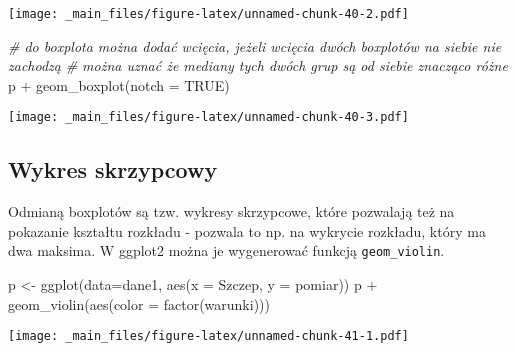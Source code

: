 \documentclass[
]{book}
\newenvironment{Shaded}{\begin{snugshade}}{\end{snugshade}}
\newcommand{\AttributeTok}[1]{\textcolor[rgb]{0.77,0.63,0.00}{#1}}
\newcommand{\CommentTok}[1]{\textcolor[rgb]{0.56,0.35,0.01}{\textit{#1}}}
\newcommand{\ConstantTok}[1]{\textcolor[rgb]{0.00,0.00,0.00}{#1}}
\newcommand{\FunctionTok}[1]{\textcolor[rgb]{0.00,0.00,0.00}{#1}}
\newcommand{\NormalTok}[1]{#1}
\newcommand{\OtherTok}[1]{\textcolor[rgb]{0.56,0.35,0.01}{#1}}
\newcommand{\SpecialCharTok}[1]{\textcolor[rgb]{0.00,0.00,0.00}{#1}}
\begin{document}
\texttt{[image: \_main\_files/figure-latex/unnamed-chunk-40-2.pdf]}

\begin{Shaded}
\begin{Highlighting}[]
\CommentTok{\# do boxplota można dodać wcięcia, jeżeli wcięcia dwóch boxplotów na siebie nie zachodzą }
\CommentTok{\# można uznać że mediany tych dwóch grup są od siebie znacząco różne}
\NormalTok{p }\SpecialCharTok{+} \FunctionTok{geom\_boxplot}\NormalTok{(}\AttributeTok{notch =} \ConstantTok{TRUE}\NormalTok{)}
\end{Highlighting}
\end{Shaded}

\texttt{[image: \_main\_files/figure-latex/unnamed-chunk-40-3.pdf]}

\hypertarget{wykres-skrzypcowy}{%
\subsection{Wykres skrzypcowy}\label{wykres-skrzypcowy}}

Odmianą boxplotów są tzw. wykresy skrzypcowe, które pozwalają też na pokazanie kształtu rozkładu - pozwala to np. na wykrycie rozkładu, który ma dwa maksima. W ggplot2 można je wygenerować funkcją \texttt{geom\_violin}.

\begin{Shaded}
\begin{Highlighting}[]
\NormalTok{p }\OtherTok{\textless{}{-}} \FunctionTok{ggplot}\NormalTok{(}\AttributeTok{data=}\NormalTok{dane1, }\FunctionTok{aes}\NormalTok{(}\AttributeTok{x =}\NormalTok{ Szczep, }\AttributeTok{y =}\NormalTok{ pomiar))}
\NormalTok{p }\SpecialCharTok{+} \FunctionTok{geom\_violin}\NormalTok{(}\FunctionTok{aes}\NormalTok{(}\AttributeTok{color =} \FunctionTok{factor}\NormalTok{(warunki)))}
\end{Highlighting}
\end{Shaded}

\texttt{[image: \_main\_files/figure-latex/unnamed-chunk-41-1.pdf]}
\end{document}
